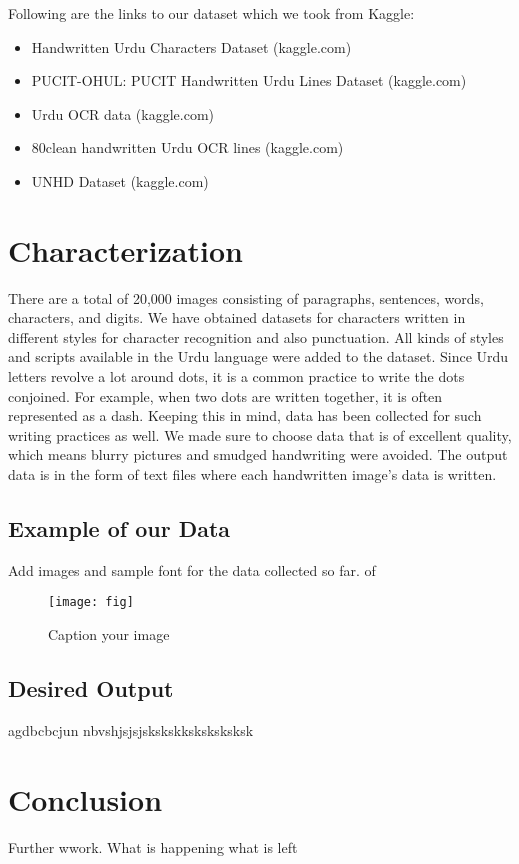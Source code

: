 \documentclass[9pt,twocolumn,twoside]{article} %
\begin{document}
Following are the links to our dataset which we took from Kaggle:

\begin{itemize}
    \item Handwritten Urdu Characters Dataset (kaggle.com)
    \item PUCIT-OHUL: PUCIT Handwritten Urdu Lines Dataset (kaggle.com)
    \item Urdu OCR data (kaggle.com)
    \item 80clean handwritten Urdu OCR lines (kaggle.com)
    \item UNHD Dataset (kaggle.com)
\end{itemize}

\section*{Characterization}
There are a total of 20,000 images consisting of paragraphs, sentences, words, characters, and digits. We have obtained datasets for characters written in different styles for character recognition and also punctuation. All kinds of styles and scripts available in the Urdu language were added to the dataset. Since Urdu letters revolve a lot around dots, it is a common practice to write the dots conjoined. For example, when two dots are written together, it is often represented as a dash. Keeping this in mind, data has been collected for such writing practices as well. We made sure to choose data that is of excellent quality, which means blurry pictures and smudged handwriting were avoided. The output data is in the form of text files where each handwritten image’s data is written.


\subsection{Example of our Data}
Add images and sample font for the data collected so far.
of 
\begin{figure}[H]  
\centering  
\texttt{[image: fig]} 
\caption{Caption your image} 
\label{lvdt4}
\end{figure}


\subsection{Desired Output}
agdbcbcjun nbvshjsjsjskskskksksksksksk




\section{Conclusion}

Further wwork. What is happening what is left

\newpage
\renewcommand{\refname}{References}


\end{document}
